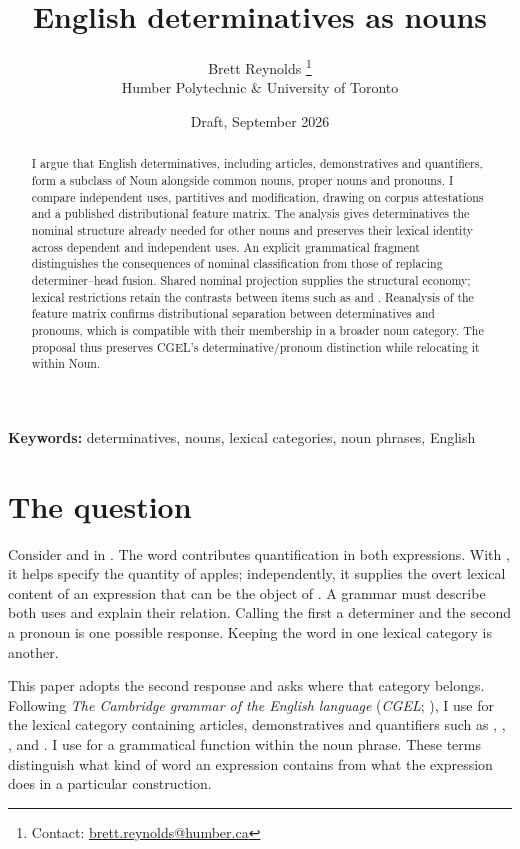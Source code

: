 \documentclass[12pt]{article}
\title{English determinatives as nouns}
\author{Brett Reynolds \orcidlink{0000-0003-0073-7195}%
\thanks{Contact: \href{mailto:brett.reynolds@humber.ca}{brett.reynolds@humber.ca}}\\
Humber Polytechnic \& University of Toronto}
\date{Draft, September 2026}
\begin{document}
\maketitle

\begin{abstract}
I argue that English determinatives, including articles, demonstratives and quantifiers, form a subclass of Noun alongside common nouns, proper nouns and pronouns. I compare independent uses, partitives and modification, drawing on corpus attestations and a published distributional feature matrix. The analysis gives determinatives the nominal structure already needed for other nouns and preserves their lexical identity across dependent and independent uses. An explicit grammatical fragment distinguishes the consequences of nominal classification from those of replacing determiner--head fusion. Shared nominal projection supplies the structural economy; lexical restrictions retain the contrasts between items such as  and . Reanalysis of the feature matrix confirms distributional separation between determinatives and pronouns, which is compatible with their membership in a broader noun category. The proposal thus preserves CGEL's determinative/pronoun distinction while relocating it within Noun.
\end{abstract}

\noindent\textbf{Keywords:} determinatives, nouns, lexical categories, noun phrases, English

\section{The question}\label{sec:intro}

Consider  and  in . The word  contributes quantification in both expressions. With , it helps specify the quantity of apples; independently, it supplies the overt lexical content of an expression that can be the object of . A grammar must describe both uses and explain their relation. Calling the first a determiner and the second a pronoun is one possible response. Keeping the word in one lexical category is another.

This paper adopts the second response and asks where that category belongs. Following \textit{The Cambridge grammar of the English language} (\textit{CGEL}; \citealt{huddleston2002}), I use  for the lexical category containing articles, demonstratives and quantifiers such as , , ,  and . I use  for a grammatical function within the noun phrase. These terms distinguish what kind of word an expression contains from what the expression does in a particular construction.
\end{document}
